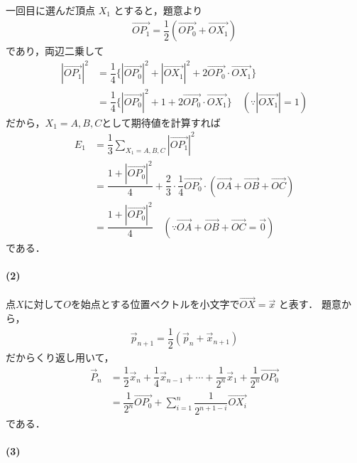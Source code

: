 \documentclass[../../main.tex]{subfiles}
\begin{document}
一回目に選んだ頂点 $X_1$ とすると，題意より
\begin{align}
  \overrightarrow{OP_1} = \dfrac{1}{2}(\overrightarrow{OP_0} + \overrightarrow{OX_1}) \label{eq:1}
\end{align}
であり，両辺二乗して
\begin{align}
  |\overrightarrow{OP_1}|^2
  & = \dfrac{1}{4}\{|\overrightarrow{OP_0}|^2 + |\overrightarrow{OX_1}|^2 + 2\overrightarrow{OP_0} \cdot \overrightarrow{OX_1}\} \\
  & = \dfrac{1}{4}\{|\overrightarrow{OP_0}|^2 + 1 + 2\overrightarrow{OP_0} \cdot \overrightarrow{OX_1}\} \quad (\because |\overrightarrow{OX_1}| = 1) \label{eq:2}
\end{align}
だから，$X_1=A,B,C$として期待値を計算すれば
\begin{align}
  E_1
  &= \dfrac{1}{3}\sum_{X_1=A,B,C} |\overrightarrow{OP_1}|^2 \\
  &= \dfrac{1+|\overrightarrow{OP_0}|^2}{4} + \dfrac{2}{3} \cdot \dfrac{1}{4} \overrightarrow{OP_0} \cdot (\overrightarrow{OA} + \overrightarrow{OB} + \overrightarrow{OC}) \\
  &= \dfrac{1+|\overrightarrow{OP_0}|^2}{4} \quad (\because \overrightarrow{OA} + \overrightarrow{OB} + \overrightarrow{OC} = \vec{0})
\end{align}
である．

\paragraph{(2)}

点$X$に対して$O$を始点とする位置ベクトルを小文字で$\overrightarrow{OX} = \vec{x}$ と表す．
題意から，
\begin{align}
  \vec{p}_{n+1} = \dfrac{1}{2}(\vec{p}_n + \vec{x}_{n+1})
\end{align}
だからくり返し用いて，
\begin{align}
  \vec{P}_n
  & = \dfrac{1}{2}\vec{x}_n + \dfrac{1}{4}\vec{x}_{n-1} + \cdots + \dfrac{1}{2^n}\vec{x}_1 + \dfrac{1}{2^n}\overrightarrow{OP_0} \\
  & = \dfrac{1}{2^n}\overrightarrow{OP_0} + \sum_{i=1}^n \dfrac{1}{2^{n+1-i}}\overrightarrow{OX_i} \label{eq:3}
\end{align}
である．

\paragraph{(3)}
\end{document}
